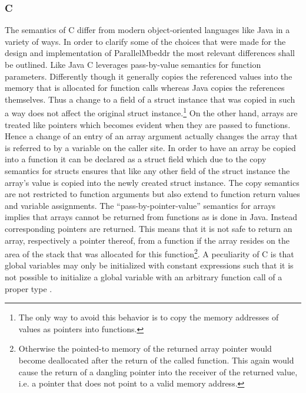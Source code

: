 \subsubsection{C}
\label{cBasics}
The semantics of C differ from modern object-oriented languages like Java in a variety of ways. In order to clarify some of the choices that were made for the design and implementation of ParallelMbeddr the most relevant differences shall be outlined. Like Java C leverages pass-by-value semantics for function parameters. Differently though it generally copies the referenced values into the memory that is allocated for function calls whereas Java copies the references themselves. Thus a change to a field of a struct instance that was copied in such a way does not affect the original struct instance.\footnote{The only way to avoid this behavior is to copy the memory addresses of values as pointers into functions.} On the other hand, arrays are treated like pointers which becomes evident when they are passed to functions. Hence a change of an entry of an array argument actually changes the array that is referred to by a variable on the caller site. In order to have an array be copied into a function it can be declared as a struct field which due to the copy semantics for structs ensures that like any other field of the struct instance the array's value is copied into the newly created struct instance. The copy semantics are not restricted to function arguments but also extend to function return values and variable assignments. The ``pass-by-pointer-value'' semantics for arrays implies that arrays cannot be returned from functions as is done in Java. Instead corresponding pointers are returned. This means that it is not safe to return an array, respectively a pointer thereof, from a function if the array resides on the area of the stack that was allocated for this function\footnote{Otherwise the pointed-to memory of the returned array pointer would become deallocated after the return of the called function. This again would cause the return of a dangling pointer into the receiver of the returned value, i.e. a pointer that does not point to a valid memory address.}. 
A peculiarity of C is that global variables may only be initialized with constant expressions such that it is not possible to initialize a global variable with an arbitrary function call of a proper type \cite[p.~48]{CForBASICProgrammers}.


